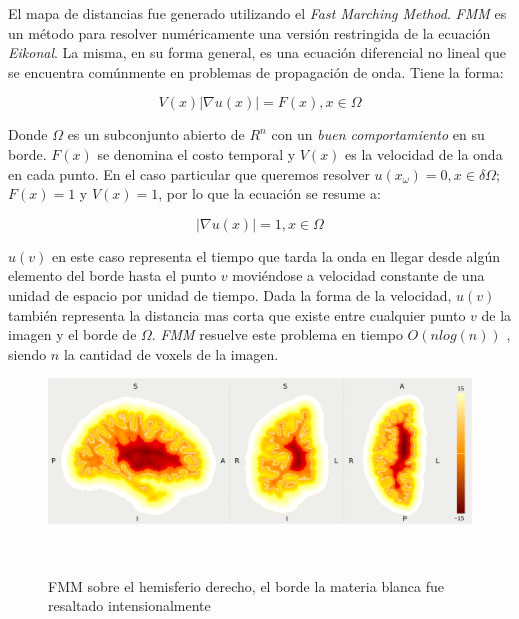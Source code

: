 El mapa de distancias fue generado utilizando el \textit{Fast Marching Method}. 
\textit{FMM} es un m\'etodo para resolver num\'ericamente una versi\'on 
restringida de la ecuaci\'on \textit{Eikonal}. La misma, en su forma general, es
una ecuaci\'on diferencial no lineal que se encuentra com\'unmente en problemas de
propagaci\'on de onda. Tiene la forma: 

$$ V(x) | \nabla u(x) | = F(x) , x \in \Omega $$ 

Donde $\Omega$ es un subconjunto abierto de $R^n$ con un
\textit{buen comportamiento} en su borde. $F(x)$ se denomina el costo temporal y
$V(x)$ es la velocidad de la onda en cada punto. En el caso particular que
queremos resolver $u(x_\omega) = 0, x \in \delta\Omega$;  $F(x)=1$ y $V(x)=1$,
por lo que la ecuaci\'on se resume a:

$$ | \nabla u(x) | = 1 , x \in \Omega $$ 

$u(v)$ en este caso representa el tiempo que tarda la onda en llegar desde
alg\'un elemento del borde hasta el punto $v$ movi\'endose a velocidad constante
de una unidad de espacio por unidad de tiempo. Dada la forma de la velocidad, 
$u(v)$ tambi\'en representa la distancia mas corta que existe entre cualquier
punto $v$ de la imagen y el borde de $\Omega$. \textit{FMM} resuelve este problema
en tiempo $O(n log(n))$ \cite{Sethian2001}, siendo $n$ la cantidad de voxels de 
la imagen.

\begin{figure}[h!]
                                                                                                                        
\begin{minipage}[b]{\textwidth}
    \includegraphics[width=\textwidth]{img/fmm.png}
    \caption{FMM sobre el hemisferio derecho, el borde la materia blanca fue
    resaltado intensionalmente}
\end{minipage} ~

\end{figure}  


